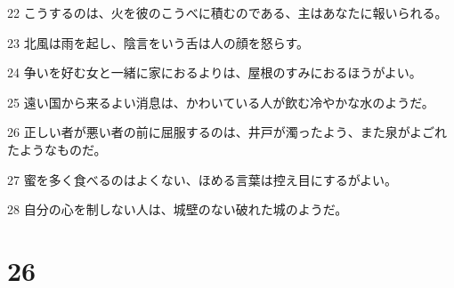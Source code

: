 \par 22 こうするのは、火を彼のこうべに積むのである、主はあなたに報いられる。
\par 23 北風は雨を起し、陰言をいう舌は人の顔を怒らす。
\par 24 争いを好む女と一緒に家におるよりは、屋根のすみにおるほうがよい。
\par 25 遠い国から来るよい消息は、かわいている人が飲む冷やかな水のようだ。
\par 26 正しい者が悪い者の前に屈服するのは、井戸が濁ったよう、また泉がよごれたようなものだ。
\par 27 蜜を多く食べるのはよくない、ほめる言葉は控え目にするがよい。
\par 28 自分の心を制しない人は、城壁のない破れた城のようだ。

\chapter{26}

